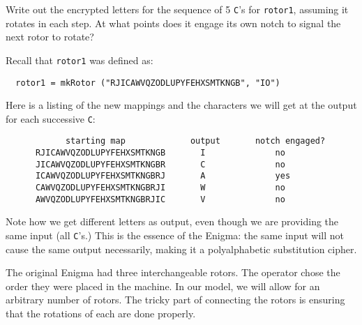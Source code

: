 \begin{Exercise}\label{ex:enigma:2}
  Write out the encrypted letters for the sequence of 5 {\tt C}'s for
  {\tt rotor1}, assuming it rotates in each step. At what points does
  it engage its own notch to signal the next rotor to rotate?
\end{Exercise}
\begin{Answer}
Recall that {\tt rotor1} was defined as:
\begin{Verbatim}
  rotor1 = mkRotor ("RJICAWVQZODLUPYFEHXSMTKNGB", "IO")
\end{Verbatim}
Here is a listing of the new mappings and the characters we will get
at the output for each successive {\tt C}:
\begin{Verbatim}
            starting map             output       notch engaged?
      RJICAWVQZODLUPYFEHXSMTKNGB       I              no
      JICAWVQZODLUPYFEHXSMTKNGBR       C              no
      ICAWVQZODLUPYFEHXSMTKNGBRJ       A              yes
      CAWVQZODLUPYFEHXSMTKNGBRJI       W              no
      AWVQZODLUPYFEHXSMTKNGBRJIC       V              no
\end{Verbatim}
Note how we get different letters as output, even though we are
providing the same input (all {\tt C}'s.) This is the essence of the
Enigma: the same input will not cause the same output necessarily,
making it a polyalphabetic substitution cipher.\indPolyAlphSubst
\end{Answer}



The original Enigma had three interchangeable rotors. The operator
chose the order they were placed in the machine. In our model, we will
allow for an arbitrary number of rotors. The tricky part of connecting
the rotors is ensuring that the rotations of each are done properly.

